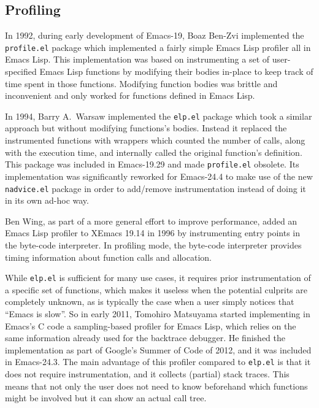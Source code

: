 \documentclass[format=acmsmall, review]{acmart}
\newcommand \Elisp {Emacs Lisp}
\begin{document}

\subsection{Profiling}
\label{sec:profiler}

In 1992, during early development of Emacs-19, Boaz Ben-Zvi implemented the
\texttt{profile.el} package which implemented a fairly simple \Elisp{}
profiler all in \Elisp{}.  This implementation was based on instrumenting
a set of user-specified \Elisp{} functions by modifying their bodies in-place
to keep track of time spent in those functions. Modifying function
bodies was brittle and inconvenient and only worked for functions
defined in \Elisp.

In 1994, Barry A.~Warsaw implemented the \texttt{elp.el} package which took
a similar approach but without modifying functions's bodies.
Instead it replaced the instrumented functions with wrappers which counted
the number of calls, along with the execution time, and internally called
the original function's definition.  This package was included in
Emacs-19.29 and made \texttt{profile.el} obsolete.  Its implementation was
significantly reworked for Emacs-24.4 to make use of the new
\texttt{nadvice.el} package in order to add/remove instrumentation instead
of doing it in its own ad-hoc way.

Ben Wing, as part of a more general effort to improve performance, added an \Elisp{} profiler to XEmacs 19.14 in
1996 by instrumenting entry points in the byte-code interpreter.
In profiling mode, the byte-code interpreter provides timing
information about function calls and allocation.

While \texttt{elp.el} is sufficient for many use cases, it requires prior
instrumentation of a specific set of functions, which makes it useless when
the potential culprits are completely unknown, as is typically the case when
a user simply notices that ``Emacs is slow''.
So in early 2011, Tomohiro Matsuyama started implementing in Emacs's C code
a sampling-based profiler for \Elisp{}, which relies on the same information
already used for the backtrace debugger.  He finished the implementation as
part of Google's Summer of Code of 2012, and it was included in Emacs-24.3.
The main advantage of this profiler compared to \texttt{elp.el} is that it
does not require instrumentation, and it collects (partial) stack traces.
This means that not only the user does not need to know beforehand which
functions might be involved but it can show an actual call tree.
\end{document}

